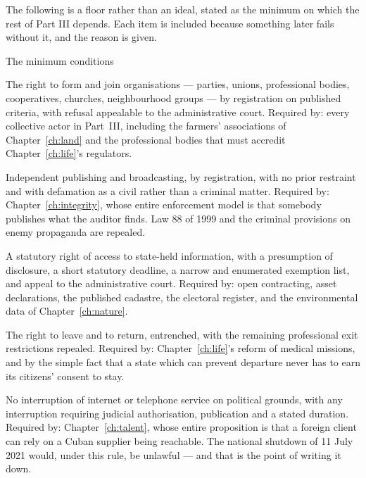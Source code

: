 The following is a floor rather than an ideal, stated as the minimum on which
the rest of Part III depends. Each item is included because something later
fails without it, and the reason is given.

\begin{design}{The minimum conditions}
\label{d:minimum}
\begin{rules}
 The right to form and join organisations --- parties,
unions, professional bodies, cooperatives, churches, neighbourhood groups ---
by registration on published criteria, with refusal appealable to the
administrative court. Required by: every collective actor in Part~III,
including the farmers' associations of Chapter~\ref{ch:land} and the
professional bodies that must accredit Chapter~\ref{ch:life}'s regulators.

 Independent publishing and broadcasting, by registration, with no
prior restraint and with defamation as a civil rather than a criminal matter.
Required by: Chapter~\ref{ch:integrity}, whose entire enforcement model is that
somebody publishes what the auditor finds. Law 88 of 1999 and the criminal
provisions on enemy propaganda are repealed.

 A statutory right of access to state-held information, with
a presumption of disclosure, a short statutory deadline, a narrow and
enumerated exemption list, and appeal to the administrative court. Required by:
open contracting, asset declarations, the published cadastre, the electoral
register, and the environmental data of Chapter~\ref{ch:nature}.

 The right to leave and to return, entrenched, with the
remaining professional exit restrictions repealed. Required by:
Chapter~\ref{ch:life}'s reform of medical missions, and by the simple fact that
a state which can prevent departure never has to earn its citizens' consent
to stay.

 No interruption of internet or telephone service on
political grounds, with any interruption requiring judicial authorisation,
publication and a stated duration. Required by: Chapter~\ref{ch:talent}, whose
entire proposition is that a foreign client can rely on a Cuban supplier being
reachable. The national shutdown of 11 July 2021 would, under this rule, be
unlawful --- and that is the point of writing it down.
\end{rules}
\end{design}

